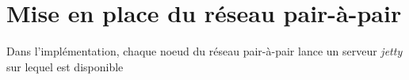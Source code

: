 \section{Mise en place du réseau pair-à-pair}
	Dans l'implémentation, chaque noeud du réseau pair-à-pair lance un serveur \emph{jetty} sur lequel est disponible 